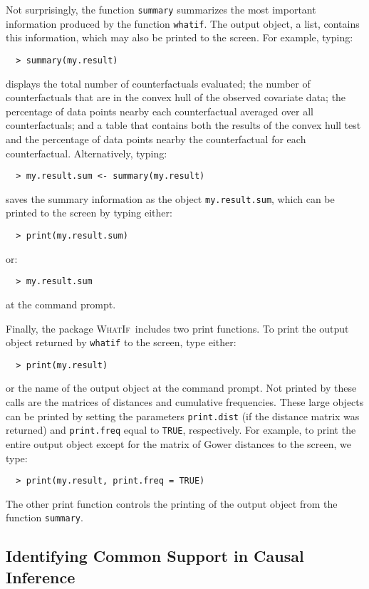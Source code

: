 \documentclass[oneside,letterpaper,titlepage]{article}
\newcommand{\WhatIf}{\textsc{WhatIf}}
\begin{document}
Not surprisingly, the function \texttt{summary} summarizes the most
important information produced by the function \texttt{whatif}.  The
output object, a list, contains this information, which may also be
printed to the screen.  For example, typing:
  \begin{verbatim}
  > summary(my.result)
  \end{verbatim}
displays the total number of counterfactuals evaluated; the number of
counterfactuals that are in the convex hull of the observed covariate
data; the percentage of data points nearby each counterfactual
averaged over all counterfactuals; and a table that contains both the
results of the convex hull test and the percentage of data points
nearby the counterfactual for each counterfactual.  Alternatively,
typing:
  \begin{verbatim}
  > my.result.sum <- summary(my.result)
  \end{verbatim}
saves the summary information as the object \texttt{my.result.sum},
which can be printed to the screen by typing either:
  \begin{verbatim}
  > print(my.result.sum)
  \end{verbatim}
or:
  \begin{verbatim}
  > my.result.sum
  \end{verbatim}
at the command prompt.

Finally, the package \WhatIf\ includes two print functions.  To print
the output object returned by \texttt{whatif} to the screen, type
either:
  \begin{verbatim}
  > print(my.result)
  \end{verbatim}
or the name of the output object at the command prompt.  Not printed
by these calls are the matrices of distances and cumulative
frequencies.  These large objects can be printed by setting the
parameters \texttt{print.dist} (if the distance matrix was returned)
and \texttt{print.freq} equal to \texttt{TRUE}, respectively.  For
example, to print the entire output object except for the matrix of
Gower distances to the screen, we type:
  \begin{verbatim}
  > print(my.result, print.freq = TRUE)
  \end{verbatim}
The other print function controls the printing of the output object
from the function \texttt{summary}.

\subsection{Identifying Common Support in Causal Inference}
\end{document}
